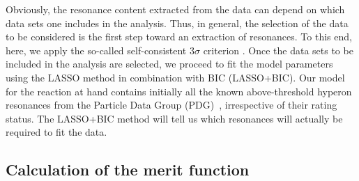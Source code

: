 \documentclass[10pt,aps,prc,superscriptaddress,twoside,twocolumn,nofootinbib,showpacs,preprintnumbers]{revtex4-1}
\begin{document}
Obviously, the resonance content extracted from the data can depend on which data sets one includes in the analysis. Thus, in general, the selection of the data to be considered is the first step toward an extraction of resonances. To this end, here, we apply the so-called self-consistent $3\sigma$ criterion \cite{Perez:2013jpa,Perez:2014yla}. Once the data sets to be included in the analysis are selected, we proceed to fit the model parameters using the LASSO method in combination with BIC (LASSO+BIC). Our model for the reaction at hand contains initially all the known above-threshold hyperon resonances from the Particle Data Group (PDG)~\cite{PDG16}, irrespective of their rating status. The LASSO+BIC method will tell us which resonances will actually be required to fit the data. 

\subsection{Calculation of the merit function}
\label{subsec:KXi-MerFunc}
\end{document}
